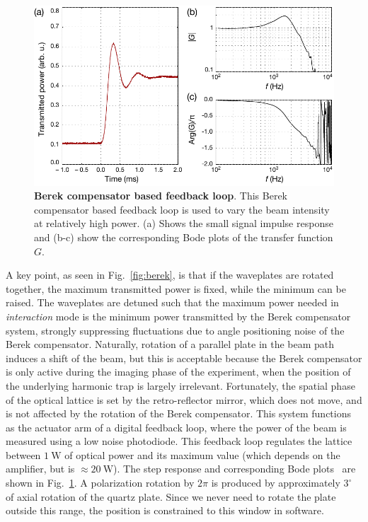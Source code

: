 \documentclass[twocolumn,aps,pra,showpacs,preprintnumbers,bibnotes]{revtex4-1}
\newcommand\unit[2]{\ensuremath{#1~\mathrm{{#2}}}}
\begin{document}
\begin{figure}
  \begin{center}
    \includegraphics[width=\columnwidth]{Figure5.pdf}
    \caption{\textbf{Berek compensator based feedback loop}. This Berek compensator based feedback loop is used to vary the beam intensity at relatively high power. (a) Shows the small signal impulse response and (b-c) show the corresponding Bode plots of the transfer function $G$.}\label{fig:berek_step_response}
  \end{center}
\end{figure}
A key point, as seen in Fig.~\ref{fig:berek}, is that if the waveplates are rotated together, the maximum transmitted power is fixed, while the minimum can be raised.
The waveplates are detuned such that the maximum power needed in \emph{interaction} mode is the minimum power transmitted by the Berek compensator system, strongly suppressing fluctuations due to angle positioning noise of the Berek compensator.
Naturally, rotation of a parallel plate in the beam path induces a shift of the beam, but this is acceptable because the Berek compensator is only active during the imaging phase of the experiment, when the position of the underlying harmonic trap is largely irrelevant.
Fortunately, the spatial phase of the optical lattice is set by the retro-reflector mirror, which does not move, and is not affected by the rotation of the Berek compensator.
This system functions as the actuator arm of a digital feedback loop, where the power of the beam is measured using a low noise photodiode. This feedback loop regulates the lattice between \unit{1}{W} of optical power and its maximum value (which depends on the amplifier, but is $\approx$\unit{20}{W}).
The step response and corresponding Bode plots~\cite{Bechhoefer2005} are shown in Fig.~\ref{fig:berek_step_response}.
A polarization rotation by $2 \pi$ is produced by approximately $3^\circ$ of axial rotation of the quartz plate.
Since we never need to rotate the plate outside this range, the position is constrained to this window in software.
\end{document}
